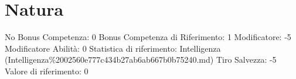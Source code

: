 \section{Natura}\label{natura}

\begin{description}
\tightlist
\item[Tags: ABI]
No Bonus Competenza: 0 Bonus Competenza di Riferimento: 1 Modificatore:
-5 Modificatore Abilità: 0 Statistica di riferimento: Intelligenza
(Intelligenza\%2002560e777c434b27ab6ab667b0b75240.md) Tiro Salvezza: -5
Valore di riferimento: 0
\end{description}
